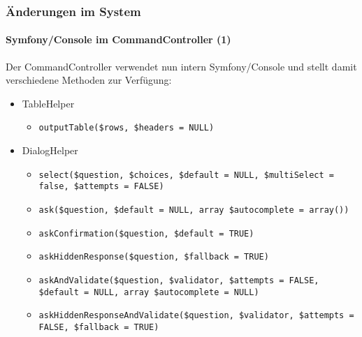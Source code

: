%

\begin{frame}[fragile]
	\frametitle{Änderungen im System}
	\framesubtitle{Symfony/Console im CommandController (1)}

	\lstset{basicstyle=\tiny\ttfamily}

	Der CommandController verwendet nun intern Symfony/Console und stellt damit
	verschiedene Methoden zur Verfügung:

	\begin{itemize}

		\item \smaller TableHelper
			\begin{itemize}
				\item\smaller\texttt{outputTable(\$rows, \$headers = NULL)}
			\end{itemize}

		\item DialogHelper
			\begin{itemize}
				\item\smaller\texttt{select(\$question, \$choices, \$default = NULL, \$multiSelect = false, \$attempts = FALSE)}
				\item\texttt{ask(\$question, \$default = NULL, array \$autocomplete = array())}
				\item\texttt{askConfirmation(\$question, \$default = TRUE)}
				\item\texttt{askHiddenResponse(\$question, \$fallback = TRUE)}
				\item\texttt{askAndValidate(\$question, \$validator, \$attempts = FALSE, \$default = NULL, array \$autocomplete = NULL)}
				\item\texttt{askHiddenResponseAndValidate(\$question, \$validator, \$attempts = FALSE, \$fallback = TRUE)}
			\end{itemize}

	\end{itemize}

\end{frame}

